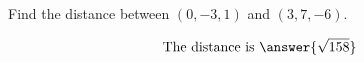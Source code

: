 \documentclass{ximera}
\author{Bart Snapp}
\begin{document}
\begin{exercise}
  Find the distance between $(0,-3,1)$ and $(3,7,-6)$.
  \begin{prompt}
  \[
  \text{The distance is }\answer{\sqrt{158}}
  \]
  \end{prompt}
\end{exercise}
\end{document}
